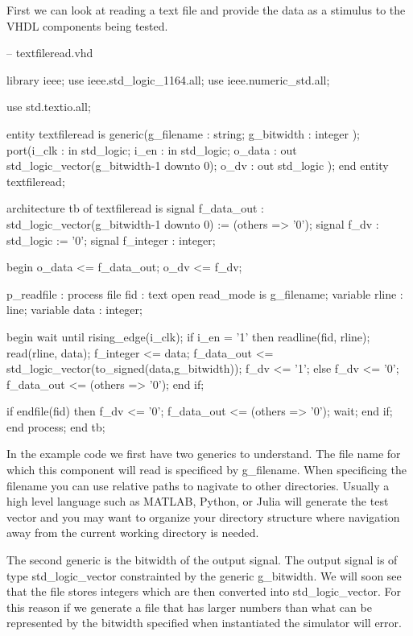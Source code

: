 First we can look at reading a text file and provide the data as a stimulus to the \ac{VHDL} components being tested. 

\begin{VHDLlisting}[tabsize=8]
-- textfileread.vhd

library	ieee;
	use ieee.std_logic_1164.all;
	use ieee.numeric_std.all;
	
	use std.textio.all;
	
entity textfileread is 
	generic(g_filename : string;
		    g_bitwidth : integer
	);
	port(i_clk    : in    std_logic;
	     i_en     : in    std_logic;
	     o_data   :   out std_logic_vector(g_bitwidth-1 downto 0);
		 o_dv     :   out std_logic	
	);
end entity textfileread;

architecture tb of textfileread is
	signal f_data_out : std_logic_vector(g_bitwidth-1 downto 0) := (others => '0');
	signal f_dv       : std_logic := '0';
	signal f_integer  : integer;
	
begin
	o_data <= f_data_out;
	o_dv <= f_dv;

	p_readfile : process
		file fid       : text open read_mode is g_filename;		
		variable rline : line;
		variable data  : integer;
		
	begin
		wait until rising_edge(i_clk);
		if i_en = '1' then
			readline(fid, rline);
			read(rline, data);
			f_integer <= data;
			f_data_out <= std_logic_vector(to_signed(data,g_bitwidth));
			f_dv <= '1';			
		else
			f_dv <= '0';
			f_data_out <= (others => '0');
		end if;
		
		if endfile(fid) then
			f_dv <= '0';
			f_data_out <= (others => '0');
			wait;
		end if;		
	end process;
end tb;
\end{VHDLlisting}

In the example code we first have two generics to understand. The file name for which this component will read is specificed by g\_filename. When specificing the filename you can use relative paths to nagivate to other directories. Usually a high level language such as MATLAB, Python, or Julia will generate the test vector and you may want to organize your directory structure where navigation away from the current working directory is needed. 

The second generic is the bitwidth of the output signal. The output signal is of type std\_logic\_vector constrainted by the generic g\_bitwidth. We will soon see that the file stores integers which are then converted into std\_logic\_vector. For this reason if we generate a file that has larger numbers than what can be represented by the bitwidth specified when instantiated the simulator will error.

